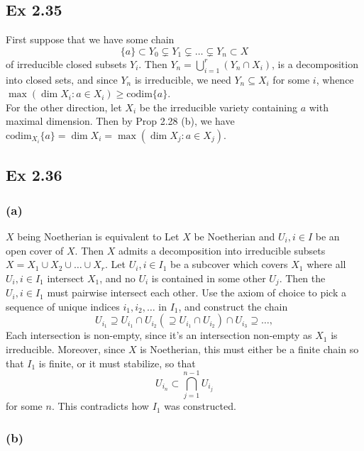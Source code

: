 \documentclass{article}
\theoremstyle{definition}
\newcommand{\codim}{\text{codim}}
\begin{document}
\subsection*{Ex 2.35} 

First suppose that we have some chain
\[
	\{a\} \subset Y_0 \subsetneq Y_1 \subsetneq \ldots \subsetneq Y_n \subset X
\] 
of irreducible closed subsets $Y_i$. Then $Y_n = \bigcup_{i=1}^{r} \left(Y_n
\cap X_i\right)$, is a decomposition into closed sets, and since $Y_n$ is
irreducible, we need $Y_n \subseteq X_i$ for some $i$, whence $\max(\dim X_i :
a \in X_i) \geq \codim \{a\}$. \\

For the other direction, let $X_{i}$ be the irreducible variety containing $a$
with maximal dimension. Then by Prop 2.28 (b), we have $\codim_{X_i} \{a\} =
\dim X_i = \max(\dim X_j : a \in X_j)$.

\subsection*{Ex 2.36} 

\subsubsection*{(a)} 

$X$ being Noetherian is equivalent to 
Let $X$ be Noetherian and $U_i, i \in I$ be an open cover of $X$. Then $X$
admits a decomposition into irreducible subsets $X = X_1 \cup X_2 \cup \ldots
\cup X_r$. Let $U_i, i \in I_1$ be a subcover which covers $X_1$ where all
$U_i, i \in I_1$ intersect $X_1$, and no $U_i$ is contained in some other
$U_j$. Then the $U_i, i \in I_1$ must pairwise intersect each other. Use the
axiom of choice to pick a sequence of unique indices $i_1, i_2, \ldots$ in
$I_1$, and construct the chain
\[
	U_{i_1} \supseteq U_{i_1} \cap U_{i_2} (\supseteq U_{i_1} \cap U_{i_2})
	\cap U_{i_3} \supseteq \ldots,
\] 
Each intersection is non-empty, since it's an intersection non-empty as $X_1$
is irreducible. Moreover, since $X$ is Noetherian, this must either be a finite
chain so that $I_1$ is finite, or it must stabilize, so that 
\[
	U_{i_n} \subset \bigcap_{j = 1}^{n - 1} U_{i_j}
\] 
for some $n$. This contradicts how $I_1$ was constructed.

\subsubsection*{(b)} 
\end{document}
